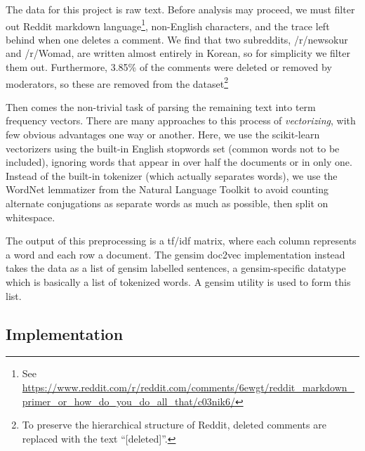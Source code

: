 \documentclass[]{article}
\begin{document}
The data for this project is raw text. Before analysis may proceed, we must filter out Reddit markdown language\footnote{See \url{https://www.reddit.com/r/reddit.com/comments/6ewgt/reddit_markdown_primer_or_how_do_you_do_all_that/c03nik6/}}, non-English characters, and the trace left behind when one deletes a comment. We find that two subreddits, /r/newsokur and /r/Womad, are written almost entirely in Korean, so for simplicity we filter them out. Furthermore, 3.85\% of the comments were deleted or removed by moderators, so these are removed from the dataset\footnote{To preserve the hierarchical structure of Reddit, deleted comments are replaced with the text ``[deleted]''.}

Then comes the non-trivial task of parsing the remaining text into term frequency vectors. There are many approaches to this process of \emph{vectorizing}, with few obvious advantages one way or another. Here, we use the scikit-learn vectorizers using the built-in English stopwords set (common words not to be included), ignoring words that appear in over half the documents or in only one. Instead of the built-in tokenizer (which actually separates words), we use the WordNet lemmatizer from the Natural Language Toolkit\cite{Bird-NLP} to avoid counting alternate conjugations as separate words as much as possible, then split on whitespace.

The output of this preprocessing is a tf/idf matrix, where each column represents a word and each row a document. The gensim doc2vec implementation instead takes the data as a list of gensim labelled sentences, a gensim-specific datatype which is basically a list of tokenized words. A gensim utility is used to form this list.


\subsection{Implementation}
\end{document}
